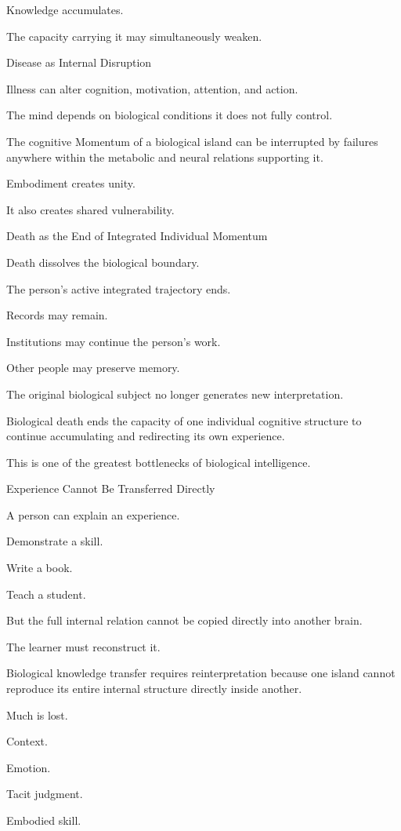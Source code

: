 Knowledge accumulates.

The capacity carrying it may simultaneously weaken.

Disease as Internal Disruption

Illness can alter cognition, motivation, attention, and action.

The mind depends on biological conditions it does not fully control.

The cognitive Momentum of a biological island can be interrupted by failures anywhere within the metabolic and neural relations supporting it.

Embodiment creates unity.

It also creates shared vulnerability.

Death as the End of Integrated Individual Momentum

Death dissolves the biological boundary.

The person’s active integrated trajectory ends.

Records may remain.

Institutions may continue the person’s work.

Other people may preserve memory.

The original biological subject no longer generates new interpretation.

Biological death ends the capacity of one individual cognitive structure to continue accumulating and redirecting its own experience.

This is one of the greatest bottlenecks of biological intelligence.

Experience Cannot Be Transferred Directly

A person can explain an experience.

Demonstrate a skill.

Write a book.

Teach a student.

But the full internal relation cannot be copied directly into another brain.

The learner must reconstruct it.

Biological knowledge transfer requires reinterpretation because one island cannot reproduce its entire internal structure directly inside another.

Much is lost.

Context.

Emotion.

Tacit judgment.

Embodied skill.

